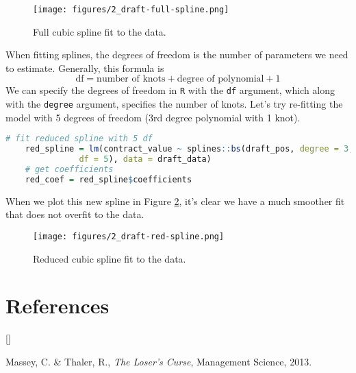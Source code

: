 \documentclass[twoside]{article}
\def\beginrefs{\begin{list}%
        {[\arabic{equation}]}{\usecounter{equation}
         \setlength{\leftmargin}{2.0truecm}\setlength{\labelsep}{0.4truecm}%
         \setlength{\labelwidth}{1.6truecm}}}
\def\endrefs{\end{list}}
\def\bibentry#1{\item[\hbox{[#1]}]}
\theoremstyle{definition}
\begin{document}
\begin{figure}[h]
    \centering
    \texttt{[image: figures/2\_draft-full-spline.png]}
    \caption{Full cubic spline fit to the data.}
    \label{fig:draft-full-spline}
\end{figure}

When fitting splines, the degrees of freedom is the number of parameters we need to estimate. Generally, this formula is
\begin{equation}
    \text{df} = \text{number of knots} + \text{degree of polynomial} + 1
\end{equation}
We can specify the degrees of freedom in \texttt{R} with the \texttt{df} argument, which along with the \texttt{degree} argument, specifies the number of knots. Let's try re-fitting the model with 5 degrees of freedom (3rd degree polynomial with 1 knot).
\begin{lstlisting}[language=R]
    # fit reduced spline with 5 df
    red_spline = lm(contract_value ~ splines::bs(draft_pos, degree = 3,
               df = 5), data = draft_data)
    # get coefficients
    red_coef = red_spline$coefficients
\end{lstlisting}
When we plot this new spline in Figure \ref{fig:draft-red-spline}, it's clear we have a much smoother fit that does not overfit to the data.
\begin{figure}[H]
    \centering
    \texttt{[image: figures/2\_draft-red-spline.png]}
    \caption{Reduced cubic spline fit to the data.}
    \label{fig:draft-red-spline}
\end{figure}

\section*{References}
\beginrefs
\bibentry{M-T}{Massey, C. \& Thaler, R.}, 
{\it The Loser's Curse},
{Management Science},
{2013}.
\endrefs
\end{document}
